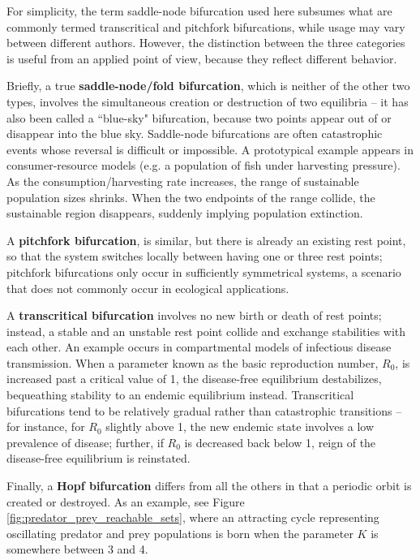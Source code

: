 For simplicity, the term saddle-node bifurcation used here subsumes what are commonly termed transcritical and pitchfork bifurcations, while usage may vary between different authors. However, the distinction between the three categories is useful from an applied point of view, because they reflect different behavior. 

Briefly, a true \textbf{saddle-node/fold bifurcation}, which is neither of the other two types, involves the simultaneous creation or destruction of two equilibria -- it has also been called a ``blue-sky" bifurcation, because two points appear out of or disappear into the blue sky. Saddle-node bifurcations are often catastrophic events whose reversal is difficult or impossible. A prototypical example appears in consumer-resource models (e.g. a population of fish under harvesting pressure). As the consumption/harvesting rate increases, the range of sustainable population sizes shrinks. When the two endpoints of the range collide, the sustainable region disappears, suddenly implying population extinction. 

A \textbf{pitchfork bifurcation}, is similar, but there is already an existing rest point, so that the system switches locally between having one or three rest points; pitchfork bifurcations only occur in sufficiently symmetrical systems, a scenario that does not commonly occur in ecological applications. 

A \textbf{transcritical bifurcation} involves no new birth or death of rest points; instead, a stable and an unstable rest point collide and exchange stabilities with each other. An example occurs in compartmental models of infectious disease transmission. When a parameter known as the basic reproduction number, $R_0$, is increased past a critical value of 1, the disease-free equilibrium destabilizes, bequeathing stability to an endemic equilibrium instead. Transcritical bifurcations tend to be relatively gradual rather than catastrophic transitions -- for instance, for $R_0$ slightly above 1, the new endemic state involves a low prevalence of disease; further, if $R_0$ is decreased back below 1, reign of the disease-free equilibrium is reinstated. 

Finally, a \textbf{Hopf bifurcation} differs from all the others in that a periodic orbit is created or destroyed. As an example, see Figure \ref{fig:predator_prey_reachable_sets}, where an attracting cycle representing oscillating predator and prey populations is born when the parameter $K$ is somewhere between 3 and 4.

